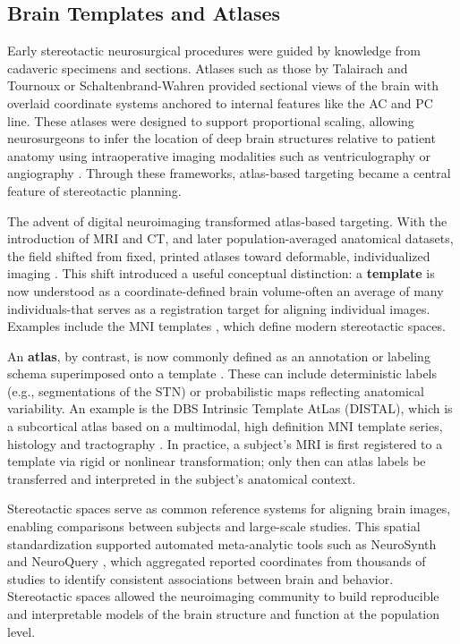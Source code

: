 \subsection{Brain Templates and Atlases}
Early stereotactic neurosurgical procedures were guided by knowledge from cadaveric specimens and sections. Atlases such as those by Talairach and Tournoux \cite{Talairach1957-eb,Talairach1988-wk} or Schaltenbrand-Wahren \cite{Schaltenbrand1977-ge} provided sectional views of the brain with overlaid coordinate systems anchored to internal features like the AC and PC line. These atlases were designed to support proportional scaling, allowing neurosurgeons to infer the location of deep brain structures relative to patient anatomy using intraoperative imaging modalities such as ventriculography or angiography \cite{Conti2023-oo}. Through these frameworks, atlas-based targeting became a central feature of stereotactic planning.

The advent of digital neuroimaging transformed atlas-based targeting. With the introduction of MRI and CT, and later population-averaged anatomical datasets, the field shifted from fixed, printed atlases toward deformable, individualized imaging \cite{Lau2017-ea}. This shift introduced a useful conceptual distinction: a \textbf{template} is now understood as a coordinate-defined brain volume-often an average of many individuals-that serves as a registration target for aligning individual images. Examples include the MNI templates \cite{Avants2008-ek,Fonov2009-oi}, which define modern stereotactic spaces.

An \textbf{atlas}, by contrast, is now commonly defined as an annotation or labeling schema superimposed onto a template \cite{Chakravarty2006-ln}. These can include deterministic labels (e.g., segmentations of the STN) or probabilistic maps reflecting anatomical variability. An example is the DBS Intrinsic Template AtLas (DISTAL), which is a subcortical atlas based on a multimodal, high definition MNI template series, histology and tractography \cite{Ewert2018-bn}. In practice, a subject's MRI is first registered to a template via rigid or nonlinear transformation; only then can atlas labels be transferred and interpreted in the subject's anatomical context.

Stereotactic spaces serve as common reference systems for aligning brain images, enabling comparisons between subjects and large-scale studies. This spatial standardization supported automated meta-analytic tools such as NeuroSynth \cite{Yarkoni2011-sr} and NeuroQuery \cite{Dockes2020-nw}, which aggregated reported coordinates from thousands of studies to identify consistent associations between brain and behavior. Stereotactic spaces allowed the neuroimaging community to build reproducible and interpretable models of the brain structure and function at the population level.

